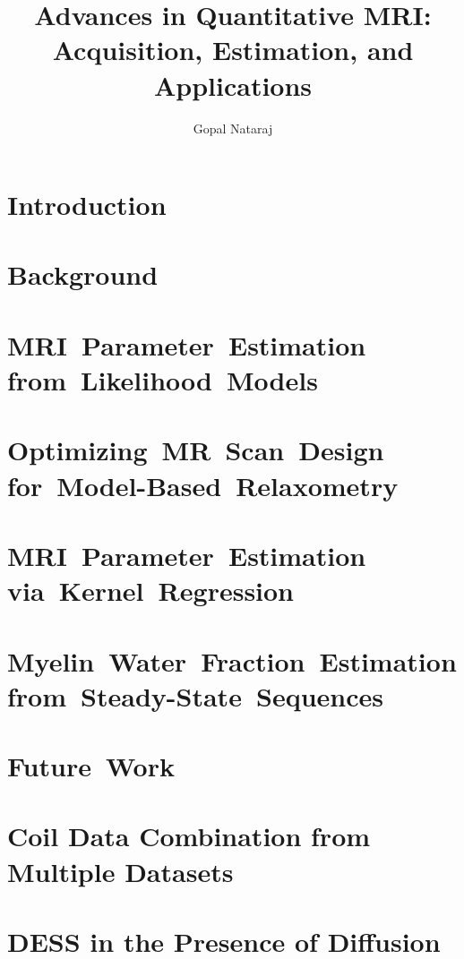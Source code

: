 \documentclass[thesis]{../cls/thesis-umich}
\title{
	Advances in Quantitative MRI: \\
	Acquisition,
	Estimation,
	and 
	Applications
}
\author{Gopal Nataraj}
\begin{document}
\chapter{Introduction}
\label{c,intro}


\chapter{Background}
\label{c,bkgrd}


\chapter{MRI~Parameter~Estimation from~Likelihood~Models}
\label{c,relax}


\chapter{Optimizing~MR~Scan~Design for~Model-Based~Relaxometry}
\label{c,scn-dsgn}


\chapter{MRI~Parameter~Estimation via~Kernel~Regression}
\label{c,krr}


\chapter{Myelin~Water~Fraction~Estimation from~Steady-State~Sequences}
\label{c,mwf}


%

\chapter{Future~Work}
\label{c,future}


\appendix
\chapter{Coil Data Combination from Multiple Datasets}
\label{a,cc-multi}


\chapter{DESS in the Presence of Diffusion}
\label{a,dess-diff}




\end{document}
